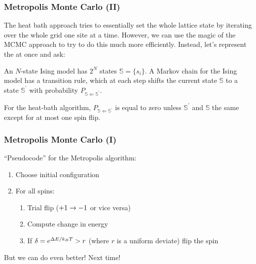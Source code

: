 \documentclass[hyperref={colorlinks=true}]{beamer}
\begin{document}


\begin{frame}%
  \frametitle{Metropolis Monte Carlo (II)}
  
  The heat bath approach tries to essentially set the whole lattice state by iterating over the whole grid one site at a time. However, we can use the magic of the MCMC approach to try to do this much more efficiently. Instead, let's represent the  at once and ask:
  
  \vspace{0.3cm}
  
  \begin{ucblock}{}
  \end{ucblock}
  
  \vspace{0.3cm}
  
  An $N$-state Ising model has $2^N$ states $\mathbb{S} = \{s_i\}$. A Markov chain for the Ising model has a transition rule, which at each step shifts the current state $\mathbb{S}$ to a state $\mathbb{S}^{\prime}$ with probability $P_{\mathbb{S}\Leftarrow\mathbb{S}^{\prime}}$.
  
  \vspace{0.3cm}
  
  For the heat-bath algorithm, $P_{\mathbb{S}\Leftarrow\mathbb{S}^{\prime}}$ is equal to zero unless $\mathbb{S}^{\prime}$ and $\mathbb{S}$ the same except for at most one spin flip.

\end{frame}



\begin{frame}%
  \frametitle{Metropolis Monte Carlo (I)}
  
  ``Pseudocode'' for the Metropolis algorithm:
  
  \begin{enumerate}
    \item Choose initial configuration
    \item For all spins:
    \begin{enumerate}
      \item Trial flip ($+1 \rightarrow -1$ or vice versa)
      \item Compute change in energy
      \item If $\delta = e^{\Delta E/k_B T} > r$ (where $r$ is a uniform deviate) flip the spin 
    \end{enumerate}
  \end{enumerate}
  
  But we can do even better! Next time!
  
\end{frame}
\end{document}
